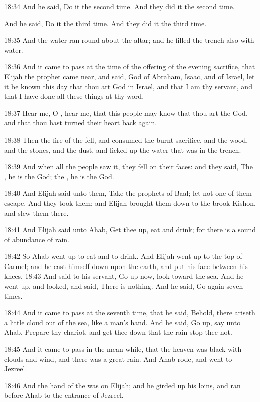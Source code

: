 18:34 And he said, Do it the second time. And they did it the second time.

And he said, Do it the third time. And they did it the third time.

18:35 And the water ran round about the altar; and he filled the trench also with water.

18:36 And it came to pass at the time of the offering of the evening sacrifice, that Elijah the prophet came near, and said, \LORD God of Abraham, Isaac, and of Israel, let it be known this day that thou art God in Israel, and that I am thy servant, and that I have done all these things at thy word.

18:37 Hear me, O \LORD, hear me, that this people may know that thou art the \LORD God, and that thou hast turned their heart back again.

18:38 Then the fire of the \LORD fell, and consumed the burnt sacrifice, and the wood, and the stones, and the dust, and licked up the water that was in the trench.

18:39 And when all the people saw it, they fell on their faces: and they said, The \LORD, he is the God; the \LORD, he is the God.

18:40 And Elijah said unto them, Take the prophets of Baal; let not one of them escape. And they took them: and Elijah brought them down to the brook Kishon, and slew them there.

18:41 And Elijah said unto Ahab, Get thee up, eat and drink; for there is a sound of abundance of rain.

18:42 So Ahab went up to eat and to drink. And Elijah went up to the top of Carmel; and he cast himself down upon the earth, and put his face between his knees, 18:43 And said to his servant, Go up now, look toward the sea. And he went up, and looked, and said, There is nothing. And he said, Go again seven times.

18:44 And it came to pass at the seventh time, that he said, Behold, there ariseth a little cloud out of the sea, like a man's hand. And he said, Go up, say unto Ahab, Prepare thy chariot, and get thee down that the rain stop thee not.

18:45 And it came to pass in the mean while, that the heaven was black with clouds and wind, and there was a great rain. And Ahab rode, and went to Jezreel.

18:46 And the hand of the \LORD was on Elijah; and he girded up his loins, and ran before Ahab to the entrance of Jezreel.

